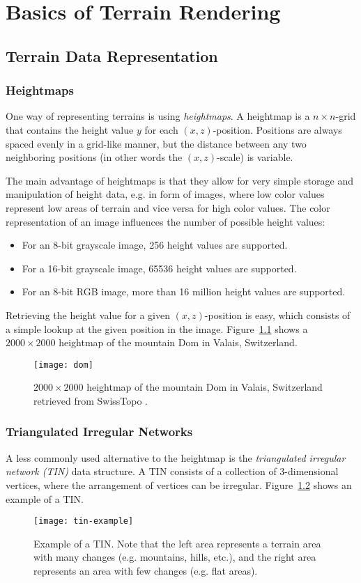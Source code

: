 \chapter{Basics of Terrain Rendering}
\section{Terrain Data Representation}
\subsection{Heightmaps}
One way of representing terrains is using \textit{heightmaps}.
A heightmap is a $n\times n$-grid that contains 
the height value $y$ for each $(x,z)$-position.
Positions are always spaced evenly in a grid-like manner,
but the distance between any two neighboring positions (in other words the $(x,z)$-scale) is variable.

The main advantage of heightmaps is that they allow for very simple storage and manipulation of height data, e.g. in form of images,
where low color values represent low areas of terrain and vice versa for
high color values. The color representation of an image influences the number of possible height values:
\begin{itemize}
  \item For an 8-bit grayscale image, 256 height values are supported.
  \item For a 16-bit grayscale image, 65536 height values are supported.
  \item For an 8-bit RGB image, more than 16 million height values are supported. 
\end{itemize}
Retrieving the height value for a given $(x,z)$-position is easy,
which consists of a simple lookup at the given position in the image.
Figure~\ref{fig:dom} shows a $2000 \times 2000$ heightmap of the mountain Dom in Valais, Switzerland.
\begin{figure}[H]
  \centering
  \texttt{[image: dom]}
  \caption{$2000 \times 2000$ heightmap of the mountain Dom in Valais, Switzerland retrieved from SwissTopo \cite{alti3d}.}\label{fig:dom}
\end{figure}

\subsection{Triangulated Irregular Networks}
A less commonly used alternative to the heightmap is the \textit{triangulated irregular network (TIN)} data structure.
A TIN consists of a collection of 3-dimensional vertices, where 
the arrangement of vertices can be irregular. Figure~\ref{fig:tin-example} shows 
an example of a TIN.
\begin{figure}[H]
  \centering
  \texttt{[image: tin-example]}
  \caption{Example of a TIN. Note that the left area represents a terrain area with many changes 
  (e.g. mountains, hills, etc.), and the right area represents an area with few changes (e.g. flat areas).}\label{fig:tin-example}
\end{figure}

